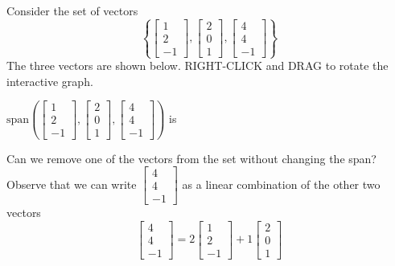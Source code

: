 \documentclass{ximera}
\begin{document}
\begin{exploration}\label{exp:redundantVecs2}
    Consider the set of vectors $$\left\{\begin{bmatrix}1\\2\\-1\end{bmatrix},\begin{bmatrix}2\\0\\1\end{bmatrix},\begin{bmatrix}4\\4\\-1\end{bmatrix}\right\}$$
The three vectors are shown below. RIGHT-CLICK and DRAG to rotate the interactive graph.
\begin{center}

$\mbox{span}\left(\begin{bmatrix}1\\2\\-1\end{bmatrix},\begin{bmatrix}2\\0\\1\end{bmatrix},\begin{bmatrix}4\\4\\-1\end{bmatrix}\right)$ is 
\end{center}

Can we remove one of the vectors from the set without changing the span?  Observe that we can write $\begin{bmatrix}4\\4\\-1\end{bmatrix}$ as a linear combination of the other two vectors
 \begin{equation}\label{eq:redundant}\begin{bmatrix}4\\4\\-1\end{bmatrix}=2\begin{bmatrix}1\\2\\-1\end{bmatrix}+1\begin{bmatrix}2\\0\\1\end{bmatrix}\end{equation}


\end{exploration}
\end{document}
